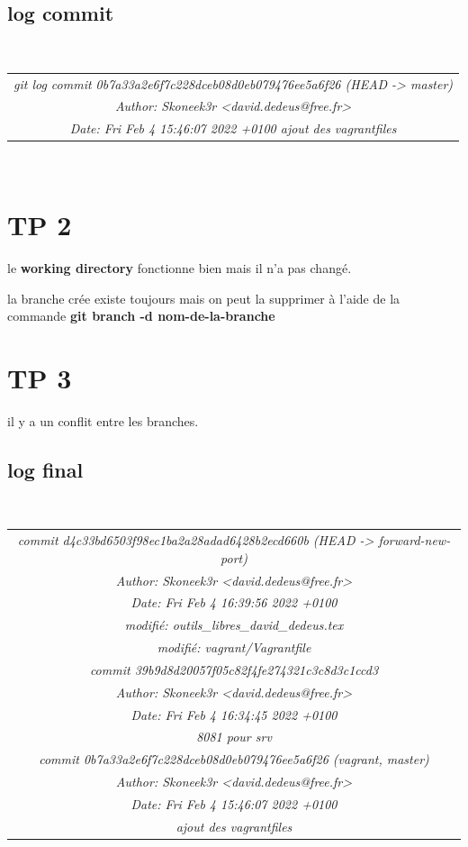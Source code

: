 \documentclass{report}
\begin{document}
\subsection{log commit}
\\
\begin{tabular}{|c|}
\hline
\textit{git log commit 0b7a33a2e6f7c228dceb08d0eb079476ee5a6f26 (HEAD -> master)}\\
\textit{Author: Skoneek3r <david.dedeus@free.fr>}\\
\textit{Date:   Fri Feb 4 15:46:07 2022 +0100 ajout des vagrantfiles}\\
\hline
\end{tabular}
\\
\section{TP 2}
le \textbf{working directory} fonctionne bien mais il n'a pas changé.

la branche crée existe toujours mais on peut la supprimer à l'aide de la commande 
\textbf{git branch -d nom-de-la-branche}

\section{TP 3}
il y a un conflit entre les branches.
\subsection{log final}
\\
\begin{tabular}{|c|}
\hline
\textit{commit d4c33bd6503f98ec1ba2a28adad6428b2ecd660b (HEAD -> forward-new-port)}\\
\textit{Author: Skoneek3r <david.dedeus@free.fr>}\\
\textit{Date:   Fri Feb 4 16:39:56 2022 +0100}\\
\textit{modifié: outils\_libres\_david\_dedeus.tex}\\
\textit{modifié: vagrant/Vagrantfile}\\
\textit{commit 39b9d8d20057f05c82f4fe274321c3c8d3c1ccd3}\\
\textit{Author: Skoneek3r <david.dedeus@free.fr>}\\
\textit{Date:   Fri Feb 4 16:34:45 2022 +0100}\\
\textit{ 8081 pour srv}\\
\textit{commit 0b7a33a2e6f7c228dceb08d0eb079476ee5a6f26 (vagrant, master)}\\
\textit{Author: Skoneek3r <david.dedeus@free.fr>}\\
\textit{Date:   Fri Feb 4 15:46:07 2022 +0100}\\
\textit{    ajout des vagrantfiles}\\
\hline
\end{tabular}
\\
\end{document}
